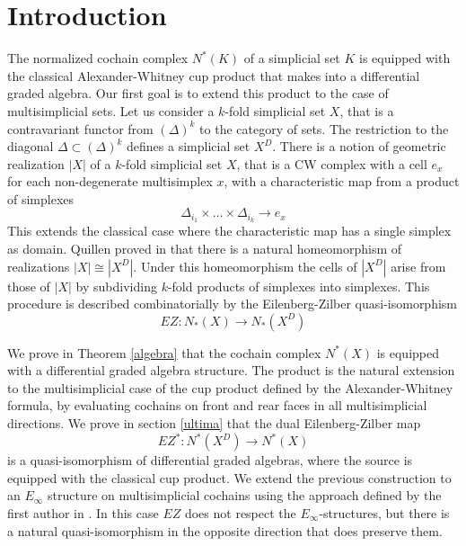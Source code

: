 
\section{Introduction} \label{s:introduction}

The normalized cochain complex $N^*(K)$ of a simplicial set $K$ is equipped with the classical Alexander-Whitney cup product that makes into a differential graded algebra.
Our first goal is to extend this product to the case of multisimplicial sets.  Let us consider a $k$-fold simplicial set $X$, that is a contravariant functor from $(\Delta)^k$ to the category of sets. The restriction to the diagonal  $\Delta \subset (\Delta)^k$ defines a simplicial set $X^D$. There is a notion
of geometric realization $|X|$ of a $k$-fold simplicial set $X$, that is a CW complex with a cell $e_x$ for each non-degenerate multisimplex $x$, with a characteristic map from a product of simplexes  $$\Delta_{i_1} \times \dots \times \Delta_{i_k} \to e_x$$ This extends the classical case where the characteristic map has a single simplex as domain.
Quillen proved in
\cite{Quillen} that there is  a natural homeomorphism of realizations $|X| \cong |X^D|$. Under this homeomorphism the cells of $|X^D|$ arise from those
of $|X|$ by subdividing $k$-fold products of simplexes into simplexes. This procedure is described combinatorially by the Eilenberg-Zilber quasi-isomorphism $$EZ:N_*(X) \to N_*(X^D)$$


\medskip

 We prove in Theorem \ref{algebra}  %
 that the cochain complex $N^*(X)$ is equipped with a differential graded algebra structure.
 The product is the natural extension to the multisimplicial case of the cup product  defined by the Alexander-Whitney formula, by
  evaluating cochains on front and rear faces in all multisimplicial directions. %
  We prove in section \ref{ultima}
   that the dual Eilenberg-Zilber map
 $$EZ^*:N^*(X^D) \to N^*(X)$$ %
  is a quasi-isomorphism of differential graded algebras, where the source is equipped with the classical cup product.
We extend the previous construction to an $E_\infty$ structure on multisimplicial cochains using the approach defined by the first author in \cite{anibal}.
In this case $EZ$ does not respect the $E_\infty$-structures, but there is a natural quasi-isomorphism in the opposite direction that does preserve them.

